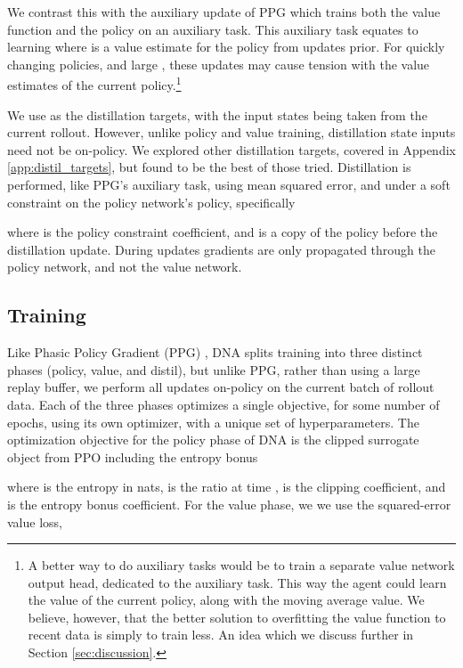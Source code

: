 \documentclass{article}
\begin{document}
We contrast this with the auxiliary update of PPG which trains both the value function and the policy on an auxiliary task. This auxiliary task equates to learning  where  is a value estimate for the policy from  updates prior. For quickly changing policies, and large , these updates may cause tension with the value estimates of the current policy.\footnote{A better way to do auxiliary tasks would be to train a separate value network output head, dedicated to the auxiliary task. This way the agent could learn the value of the current policy, along with the moving average value. We believe, however, that the better solution to overfitting the value function to recent data is simply to train less. An idea which we discuss further in Section \ref{sec:discussion}.}

We use  as the distillation targets, with the input states  being taken from the current rollout. However, unlike policy and value training, distillation state inputs need not be on-policy. We explored other distillation targets, covered in Appendix \ref{app:distil_targets}, but found  to be the best of those tried. Distillation is performed, like PPG's auxiliary task, using mean squared error, and under a soft constraint on the policy network's policy, specifically

where  is the policy constraint coefficient, and  is a copy of the policy before the distillation update. During updates gradients are only propagated through the policy network, and not the value network.

\subsection{Training}

Like Phasic Policy Gradient (PPG) \cite{cobbe2021phasic}, DNA splits training into three distinct phases (policy, value, and distil), but unlike PPG, rather than using a large replay buffer, we perform all updates on-policy on the current batch of rollout data. Each of the three phases optimizes a single objective, for some number of epochs, using its own optimizer, with a unique set of hyperparameters. The optimization objective for the policy phase of DNA is the clipped surrogate object from PPO \cite{schulman2017proximal} including the entropy bonus 

where  is the entropy in nats,  is the ratio  at time ,  is the clipping coefficient, and  is the entropy bonus coefficient. For the value phase, we we use the squared-error value loss, 
\end{document}
